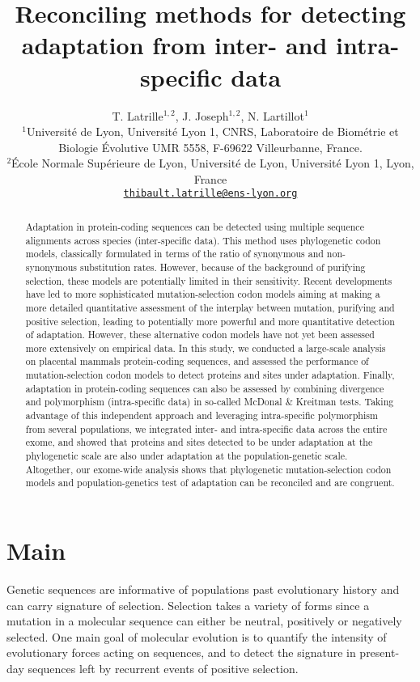 \documentclass{article}
\title{Reconciling methods for detecting adaptation from inter- and intra-specific data}
\author{
	\large
	T. {Latrille}$^{1,2}$, J. Joseph$^{1,2}$, N. {Lartillot}$^{1}$ \\
	\normalsize
	$^{1}$Université de Lyon, Université Lyon 1, CNRS, Laboratoire de Biométrie et Biologie Évolutive UMR 5558, F-69622 Villeurbanne, France.\\
	$^{2}$École Normale Supérieure de Lyon, Université de Lyon, Université Lyon 1, Lyon, France\\
	\texttt{\href{mailto:thibault.latrille@ens-lyon.org}{thibault.latrille@ens-lyon.org}} \\
}
\begin{document}
\maketitle

\begin{abstract}
	Adaptation in protein-coding sequences can be detected using multiple sequence alignments across species (inter-specific data).
	This method uses phylogenetic codon models, classically formulated in terms of the ratio of synonymous and non-synonymous substitution rates.
	However, because of the background of purifying selection, these models are potentially limited in their sensitivity.
	Recent developments have led to more sophisticated mutation-selection codon models aiming at making a more detailed quantitative assessment of the interplay between mutation, purifying and positive selection, leading to potentially more powerful and more quantitative detection of adaptation.
	However, these alternative codon models have not yet been assessed more extensively on empirical data.
	In this study, we conducted a large-scale analysis on placental mammals protein-coding sequences, and assessed the performance of mutation-selection codon models to detect proteins and sites under adaptation.
	Finally, adaptation in protein-coding sequences can also be assessed by combining divergence and polymorphism (intra-specific data) in so-called McDonal \& Kreitman tests.
	Taking advantage of this independent approach and leveraging intra-specific polymorphism from several populations, we integrated inter- and intra-specific data across the entire exome, and showed that proteins and sites detected to be under adaptation at the phylogenetic scale are also under adaptation at the population-genetic scale.
	Altogether, our exome-wide analysis shows that phylogenetic mutation-selection codon models and population-genetics test of adaptation can be reconciled and are congruent.
\end{abstract}


\section*{Main}

Genetic sequences are informative of populations past evolutionary history and can carry signature of selection.
Selection takes a variety of forms since a mutation in a molecular sequence can either be neutral, positively or negatively selected.
One main goal of molecular evolution is to quantify the intensity of evolutionary forces acting on sequences, and to detect the signature in present-day sequences left by recurrent events of positive selection.
\end{document}
